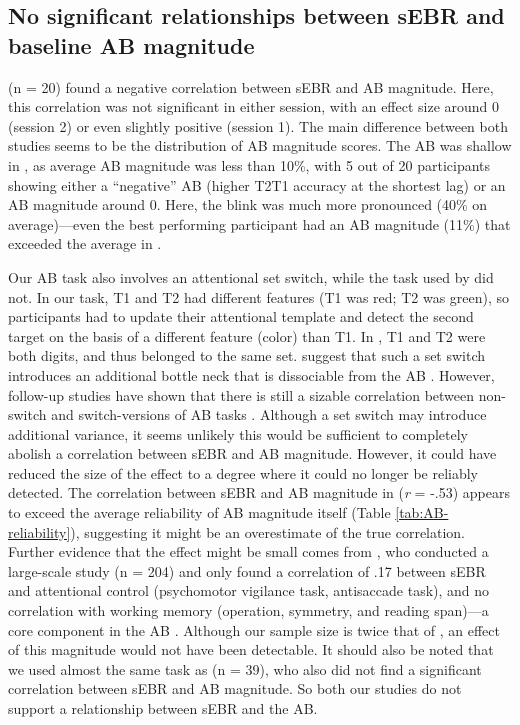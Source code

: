 \documentclass[11pt,english,]{memoir}
\begin{document}
\hypertarget{no-significant-relationships-between-sebr-and-baseline-ab-magnitude}{%
\subsection{No significant relationships between sEBR and baseline AB magnitude}\label{no-significant-relationships-between-sebr-and-baseline-ab-magnitude}}

\textcite{Colzato2008} (n = 20) found a negative correlation between sEBR and AB magnitude. Here, this correlation was not significant in either session, with an effect size around 0 (session 2) or even slightly positive (session 1). The main difference between both studies seems to be the distribution of AB magnitude scores. The AB was shallow in \textcite{Colzato2008}, as average AB magnitude was less than 10\%, with 5 out of 20 participants showing either a ``negative'' AB (higher T2\textbar{}T1 accuracy at the shortest lag) or an AB magnitude around 0. Here, the blink was much more pronounced (40\% on average)---even the best performing participant had an AB magnitude (11\%) that exceeded the average in \textcite{Colzato2008}.

Our AB task also involves an attentional set switch, while the task used by \textcite{Colzato2008} did not. In our task, T1 and T2 had different features (T1 was red; T2 was green), so participants had to update their attentional template and detect the second target on the basis of a different feature (color) than T1. In \textcite{Colzato2008}, T1 and T2 were both digits, and thus belonged to the same set. \textcite{Kelly2011} suggest that such a set switch introduces an additional bottle neck that is dissociable from the AB \autocite{Potter1998}. However, follow-up studies have shown that there is still a sizable correlation between non-switch and switch-versions of AB tasks \autocites{Dale2013}{Dale2013a}. Although a set switch may introduce additional variance, it seems unlikely this would be sufficient to completely abolish a correlation between sEBR and AB magnitude. However, it could have reduced the size of the effect to a degree where it could no longer be reliably detected. The correlation between sEBR and AB magnitude in \textcite{Colzato2008} (\emph{r} = -.53) appears to exceed the average reliability of AB magnitude itself (Table \ref{tab:AB-reliability}), suggesting it might be an overestimate of the true correlation. Further evidence that the effect might be small comes from \textcite{Unsworth2019}, who conducted a large-scale study (n = 204) and only found a correlation of .17 between sEBR and attentional control (psychomotor vigilance task, antisaccade task), and no correlation with working memory (operation, symmetry, and reading span)---a core component in the AB \autocites{Dux2009}{Martens2010}. Although our sample size is twice that of \textcite{Colzato2008}, an effect of this magnitude would not have been detectable. It should also be noted that we used almost the same task as \textcite{Slagter2013} (n = 39), who also did not find a significant correlation between sEBR and AB magnitude. So both our studies do not support a relationship between sEBR and the AB.
\end{document}
